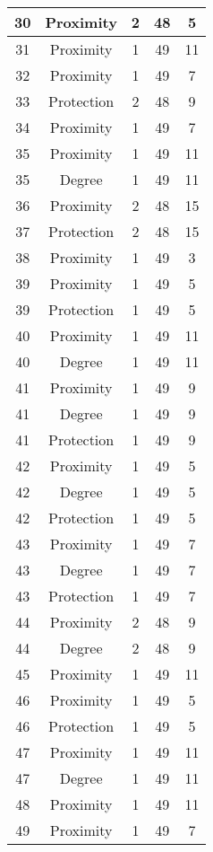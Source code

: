 \documentclass[results.tex]{subfiles}
\begin{document}
\begin{center}
\begin{tabular}{| c || c | c | c | c |}
    \hline
    30 & Proximity & 2 & 48 & 5 \\ 
    \hline
    31 & Proximity & 1 & 49 & 11 \\ 
    \hline
    32 & Proximity & 1 & 49 & 7 \\ 
    \hline
    33 & Protection & 2 & 48 & 9 \\ 
    \hline
    34 & Proximity & 1 & 49 & 7 \\ 
    \hline
    35 & Proximity & 1 & 49 & 11 \\ 
    \hline
    35 & Degree & 1 & 49 & 11 \\ 
    \hline
    36 & Proximity & 2 & 48 & 15 \\ 
    \hline
    37 & Protection & 2 & 48 & 15 \\ 
    \hline
    38 & Proximity & 1 & 49 & 3 \\ 
    \hline
    39 & Proximity & 1 & 49 & 5 \\ 
    \hline
    39 & Protection & 1 & 49 & 5 \\ 
    \hline
    40 & Proximity & 1 & 49 & 11 \\ 
    \hline
    40 & Degree & 1 & 49 & 11 \\ 
    \hline
    41 & Proximity & 1 & 49 & 9 \\ 
    \hline
    41 & Degree & 1 & 49 & 9 \\ 
    \hline
    41 & Protection & 1 & 49 & 9 \\ 
    \hline
    42 & Proximity & 1 & 49 & 5 \\ 
    \hline
    42 & Degree & 1 & 49 & 5 \\ 
    \hline
    42 & Protection & 1 & 49 & 5 \\ 
    \hline
    43 & Proximity & 1 & 49 & 7 \\ 
    \hline
    43 & Degree & 1 & 49 & 7 \\ 
    \hline
    43 & Protection & 1 & 49 & 7 \\ 
    \hline
    44 & Proximity & 2 & 48 & 9 \\ 
    \hline
    44 & Degree & 2 & 48 & 9 \\ 
    \hline
    45 & Proximity & 1 & 49 & 11 \\ 
    \hline
    46 & Proximity & 1 & 49 & 5 \\ 
    \hline
    46 & Protection & 1 & 49 & 5 \\ 
    \hline
    47 & Proximity & 1 & 49 & 11 \\ 
    \hline
    47 & Degree & 1 & 49 & 11 \\ 
    \hline
    48 & Proximity & 1 & 49 & 11 \\ 
    \hline
    49 & Proximity & 1 & 49 & 7 \\ 
    \hline   \end{tabular}
\end{center}
\end{document}
